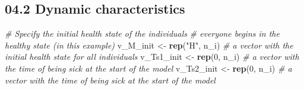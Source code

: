 \documentclass[
]{article}
\newenvironment{Shaded}{\begin{snugshade}}{\end{snugshade}}
\newcommand{\CommentTok}[1]{\textcolor[rgb]{0.56,0.35,0.01}{\textit{#1}}}
\newcommand{\DataTypeTok}[1]{\textcolor[rgb]{0.13,0.29,0.53}{#1}}
\newcommand{\DecValTok}[1]{\textcolor[rgb]{0.00,0.00,0.81}{#1}}
\newcommand{\KeywordTok}[1]{\textcolor[rgb]{0.13,0.29,0.53}{\textbf{#1}}}
\newcommand{\NormalTok}[1]{#1}
\newcommand{\OperatorTok}[1]{\textcolor[rgb]{0.81,0.36,0.00}{\textbf{#1}}}
\newcommand{\StringTok}[1]{\textcolor[rgb]{0.31,0.60,0.02}{#1}}
\begin{document}
\begin{Shaded}
\end{Shaded}

\hypertarget{dynamic-characteristics}{%
\subsection{04.2 Dynamic
characteristics}\label{dynamic-characteristics}}

\begin{Shaded}
\begin{Highlighting}[]
\CommentTok{# Specify the initial health state of the individuals }
\CommentTok{# everyone begins in the healthy state (in this example)}
\NormalTok{v_M_init  <-}\StringTok{ }\KeywordTok{rep}\NormalTok{(}\StringTok{"H"}\NormalTok{, n_i) }\CommentTok{# a vector with the initial health state for all individuals }
\NormalTok{v_Ts1_init <-}\StringTok{ }\KeywordTok{rep}\NormalTok{(}\DecValTok{0}\NormalTok{, n_i)  }\CommentTok{# a vector with the time of being sick at the start of the model }
\NormalTok{v_Ts2_init <-}\StringTok{ }\KeywordTok{rep}\NormalTok{(}\DecValTok{0}\NormalTok{, n_i)  }\CommentTok{# a vector with the time of being sick at the start of the model   }
\end{Highlighting}
\end{Shaded}
\end{document}
